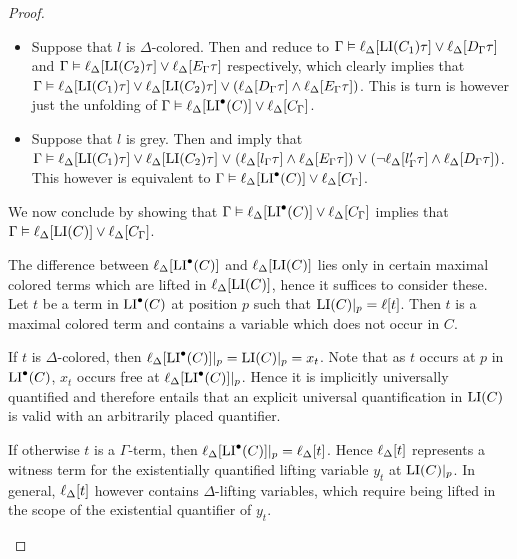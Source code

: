 \documentclass[,%
	draft=false,%
	numbers=noendperiod
	11pt,
	a4paper,
	oneside,%
	openany,
]{memoir}
\begin{document}
\begin{proof}
\begin{description}
\begin{itemize}
				\item Suppose that $l$ is $\Delta$-colored.
					Then \markA{} and \markB{} reduce to 
					$\Gamma \vDash \ell_{\Delta}[\operatorname{LI}(C_1)\tau] \lor \ell_{\Delta}[D_\Gamma\tau]$
					and
					$\Gamma \vDash \ell_{\Delta}[\operatorname{LI}(C_2)\tau] \lor \ell_{\Delta}[E_\Gamma\tau]$
					respectively,
					which clearly implies that 
					$\Gamma \vDash \ell_{\Delta}[\operatorname{LI}(C_1)\tau] \lor \ell_{\Delta}[\operatorname{LI}(C_2)\tau] \lor (\ell_{\Delta}[D_\Gamma\tau] \land \ell_{\Delta}[E_\Gamma\tau])$.
					This is turn is however just the unfolding of
					$\Gamma \vDash \ell_{\Delta}[\operatorname{LI}^\bullet(C)] \lor \ell_{\Delta}[C_\Gamma]$.

				\item Suppose that $l$ is grey.
					Then \markA{} and \markB{} imply that
					$\Gamma \vDash
					\ell_{\Delta}[\operatorname{LI}(C_1)\tau] \lor
					\ell_{\Delta}[\operatorname{LI}(C_2)\tau] \;{\lor}\;\allowbreak
					(\ell_{\Delta}[l_\Gamma\tau] \land \ell_{\Delta}[E_\Gamma\tau]) \;{\lor}\;\allowbreak
					(\lnot\ell_{\Delta}[l'_\Gamma\tau] \land \ell_{\Delta}[D_\Gamma\tau])$.
					This however is equivalent to
					$\Gamma \vDash \ell_{\Delta}[\operatorname{LI}^\bullet(C)] \lor \ell_{\Delta}[C_\Gamma]$.

			\end{itemize}


			We now conclude by showing that 
			$\Gamma \vDash \ell_{\Delta}[\operatorname{LI}^\bullet(C)] \lor \ell_{\Delta}[C_\Gamma]$
			implies that 
			$\Gamma \vDash \ell_{\Delta}[\operatorname{LI}(C)] \lor \ell_{\Delta}[C_\Gamma]$.

			The difference between $\ell_{\Delta}[\operatorname{LI}^\bullet(C)]$ and $\ell_{\Delta}[\operatorname{LI}(C)]$ lies only in certain maximal colored terms which are lifted in $\ell_{\Delta}[\operatorname{LI}(C)]$, hence it suffices to consider these.
			Let $t$ be a term in $\operatorname{LI}^\bullet(C)$ at position $p$ such that $\operatorname{LI}(C)|_{p} = \ell[t]$.
			Then $t$ is a maximal colored term and contains a variable which does not occur in\nolinebreak{} $C$.

			If $t$ is $\Delta$-colored, then $\ell_{\Delta}[\operatorname{LI}^\bullet(C)]|_{p} = \operatorname{LI}(C)|_{p} = x_t$.
			Note that as $t$ occurs at $p$ in $\operatorname{LI}^\bullet(C)$, $x_t$ occurs free at $\ell_{\Delta}[\operatorname{LI}^\bullet(C)]|_{p}$.
			Hence it is implicitly universally quantified and therefore entails that an explicit universal quantification in $\operatorname{LI}(C)$ is valid with an arbitrarily placed quantifier.  

			If otherwise $t$ is a $\Gamma$-term, then $\ell_{\Delta}[\operatorname{LI}^\bullet(C)]|_{p} = \ell_{\Delta}[t]$.
			Hence $\ell_{\Delta}[t]$ represents a witness term for the existentially quantified lifting variable $y_t$ at $\operatorname{LI}(C)|_{p}$.
			In general, $\ell_{\Delta}[t]$ however contains $\Delta$-lifting variables, which require being lifted in the scope of the existential quantifier of $y_t$. 


\end{description}
\end{proof}
\end{document}
